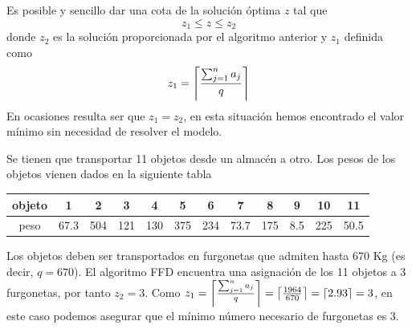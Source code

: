 \noindent Es posible y sencillo dar una cota de la solución óptima $z$ tal que
\[
    z_1\leq z\leq z_2
\]
\noindent donde $z_2$ es la solución proporcionada por el algoritmo anterior y $z_1$ definida como
\[
    z_1= \ceil*{\frac{\sum_{j=1}^n a_j}{q}}
\]
\noindent En ocasiones resulta ser que $z_1=z_2$, en esta situación hemos encontrado el valor mínimo sin necesidad de
resolver el modelo.

\begin{ejemplo}
    Se tienen que transportar 11 objetos desde un almacén a otro. Los pesos de los objetos vienen dados en la siguiente tabla
    
    \begin{center}
        \begin{tabular}{c|ccccccccccc}
            \hline
            objeto & 1 & 2 & 3 & 4 & 5 & 6 & 7 & 8 & 9 & 10 & 11 \\ \hline
            peso & 67.3 & 504 & 121 & 130 & 375 & 234 & 73.7 & 175 & 8.5 & 225 & 50.5 \\ \hline
        \end{tabular}
    \end{center}

    Los objetos deben ser transportados en furgonetas que admiten hasta 670 Kg (es decir, $q=670$). El algoritmo FFD encuentra
    una asignación de los 11 objetos a 3 furgonetas, por tanto $z_2=3$. Como $z_1=\ceil*{\frac{\sum_{j=1}^n a_j}{q}}=
    \ceil*{\frac{1964}{670}}=\ceil*{2.93}=3$, en este caso podemos asegurar que el mínimo número necesario de furgonetas es 3.
\end{ejemplo}
